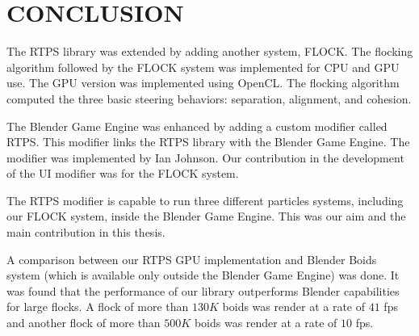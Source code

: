 \chapter{CONCLUSION}

The RTPS library was extended by adding another system, FLOCK. The flocking algorithm followed by the FLOCK system was implemented for CPU and GPU use. The GPU version was implemented using OpenCL. The flocking algorithm computed the three basic steering behaviors: separation, alignment, and cohesion. 

The Blender Game Engine was enhanced by adding a custom modifier called RTPS. This modifier links the RTPS library with the Blender Game Engine. The modifier was implemented by Ian Johnson. Our contribution in the development of the UI modifier was for the FLOCK system.

The RTPS modifier is capable to run three different particles systems, including our FLOCK system, inside the Blender Game Engine. This was our aim and the main contribution in this thesis.

A comparison between our RTPS GPU implementation and Blender Boids system (which is available only outside the Blender Game Engine) was done. It was found that the performance of our library outperforms Blender capabilities for large flocks. A flock of more than $130K$ boids was render at a rate of $41$ fps and another flock of more than $500K$ boids was render at a rate of $10$ fps. 

